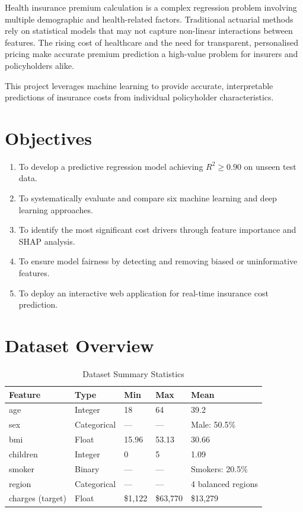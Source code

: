 \documentclass[12pt,a4paper]{report}
\begin{document}
Health insurance premium calculation is a complex regression problem involving multiple demographic and health-related factors. Traditional actuarial methods rely on statistical models that may not capture non-linear interactions between features. The rising cost of healthcare and the need for transparent, personalised pricing make accurate premium prediction a high-value problem for insurers and policyholders alike.

This project leverages machine learning to provide accurate, interpretable predictions of insurance costs from individual policyholder characteristics.

\section{Objectives}

\begin{enumerate}[label=\textbf{O\arabic*.}]
  \item To develop a predictive regression model achieving $R^2 \geq 0.90$ on unseen test data.
  \item To systematically evaluate and compare six machine learning and deep learning approaches.
  \item To identify the most significant cost drivers through feature importance and SHAP analysis.
  \item To ensure model fairness by detecting and removing biased or uninformative features.
  \item To deploy an interactive web application for real-time insurance cost prediction.
\end{enumerate}

\section{Dataset Overview}

\begin{table}[H]
\centering
\caption{Dataset Summary Statistics}
\begin{tabular}{lllll}
\toprule
\textbf{Feature} & \textbf{Type} & \textbf{Min} & \textbf{Max} & \textbf{Mean} \\
\midrule
age              & Integer     & 18      & 64       & 39.2 \\
sex              & Categorical & ---     & ---      & Male: 50.5\% \\
bmi              & Float       & 15.96   & 53.13    & 30.66 \\
children         & Integer     & 0       & 5        & 1.09 \\
smoker           & Binary      & ---     & ---      & Smokers: 20.5\% \\
region           & Categorical & ---     & ---      & 4 balanced regions \\
charges (target) & Float       & \$1,122 & \$63,770 & \$13,279 \\
\bottomrule
\end{tabular}
\end{table}
\end{document}
